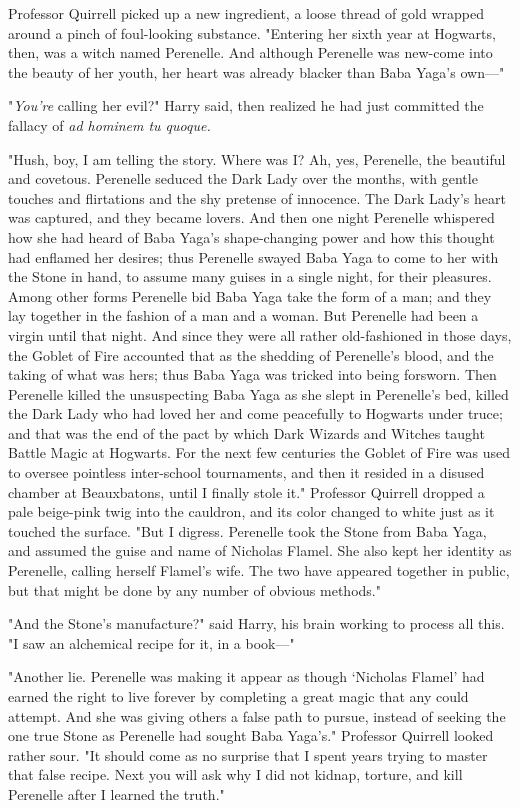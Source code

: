 Professor Quirrell picked up a new ingredient, a loose thread of gold wrapped 
around a pinch of foul-looking substance. "Entering her sixth year at Hogwarts, 
then, was a witch named Perenelle. And although Perenelle was new-come into the 
beauty of her youth, her heart was already blacker than Baba Yaga's own---"

"\emph{You're} calling her evil?" Harry said, then realized he had just 
committed the fallacy of \emph{ad hominem tu quoque.}

"Hush, boy, I am telling the story. Where was I? Ah, yes, Perenelle, the 
beautiful and covetous. Perenelle seduced the Dark Lady over the months, with 
gentle touches and flirtations and the shy pretense of innocence. The Dark 
Lady's heart was captured, and they became lovers. And then one night Perenelle 
whispered how she had heard of Baba Yaga's shape-changing power and how this 
thought had enflamed her desires; thus Perenelle swayed Baba Yaga to come to 
her with the Stone in hand, to assume many guises in a single night, for their 
pleasures. Among other forms Perenelle bid Baba Yaga take the form of a man; 
and they lay together in the fashion of a man and a woman. But Perenelle had 
been a virgin until that night. And since they were all rather old-fashioned in 
those days, the Goblet of Fire accounted that as the shedding of Perenelle's 
blood, and the taking of what was hers; thus Baba Yaga was tricked into being 
forsworn. Then Perenelle killed the unsuspecting Baba Yaga as she slept in 
Perenelle's bed, killed the Dark Lady who had loved her and come peacefully to 
Hogwarts under truce; and that was the end of the pact by which Dark Wizards 
and Witches taught Battle Magic at Hogwarts. For the next few centuries the 
Goblet of Fire was used to oversee pointless inter-school tournaments, and then 
it resided in a disused chamber at Beauxbatons, until I finally stole it." 
Professor Quirrell dropped a pale beige-pink twig into the cauldron, and its 
color changed to white just as it touched the surface. "But I digress. 
Perenelle took the Stone from Baba Yaga, and assumed the guise and name of 
Nicholas Flamel. She also kept her identity as Perenelle, calling herself 
Flamel's wife. The two have appeared together in public, but that might be done 
by any number of obvious methods."

"And the Stone's manufacture?" said Harry, his brain working to process all 
this. "I saw an alchemical recipe for it, in a book---"

"Another lie. Perenelle was making it appear as though `Nicholas Flamel' had 
earned the right to live forever by completing a great magic that any could 
attempt. And she was giving others a false path to pursue, instead of seeking 
the one true Stone as Perenelle had sought Baba Yaga's." Professor Quirrell 
looked rather sour. "It should come as no surprise that I spent years trying to 
master that false recipe. Next you will ask why I did not kidnap, torture, and 
kill Perenelle after I learned the truth."

